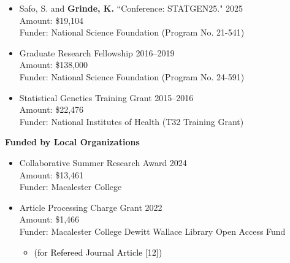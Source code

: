 \documentclass[margin]{res}
\newcommand{\annotateItem}[1]{
	\begin{itemize} \vspace{-0.1cm}
	\item[] 
	\begin{footnotesize}\textcolor{black}{(#1)}\end{footnotesize}
	\end{itemize} \vspace{-0.1cm}
}
\begin{document}
\begin{resume}
\begin{itemize}
\item[3.] Safo, S. and \textbf{Grinde, K.} ``Conference: STATGEN25."  \hfill 2025 \\ 
Amount: \$19,104 \\ %
Funder: National Science Foundation (Program No. 21-541)
	
\item[2.] Graduate Research Fellowship \hfill 2016--2019 \\
Amount: \$138,000 \\
Funder: National Science Foundation (Program No. 24-591)

\item[1.] Statistical Genetics Training Grant \hfill 2015--2016  \\
Amount: \$22,476 \\
Funder: National Institutes of Health (T32 Training Grant) %
\end{itemize}

\textbf{Funded by Local Organizations} 
\begin{itemize}
\item[6.] Collaborative Summer Research Award \hfill 2024 \\
Amount: \$13,461\\
Funder: Macalester College


\item[5.] Article Processing Charge Grant \hfill 2022 \\ %
Amount: \$1,466 \\
Funder: Macalester College Dewitt Wallace Library Open Access Fund
  \annotateItem{for Refereed Journal Article [12]}
  

\end{itemize}
\end{resume}
\end{document}
